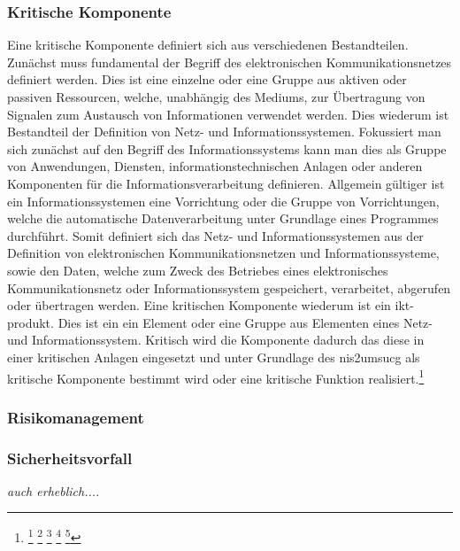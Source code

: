 \documentclass[11pt,a4paper,hidelinks]{article}   %
\begin{document}
            \subsubsection{Kritische Komponente}
            Eine kritische Komponente definiert sich aus verschiedenen Bestandteilen. Zunächst muss fundamental der Begriff des elektronischen Kommunikationsnetzes definiert werden. Dies ist eine einzelne oder eine Gruppe aus aktiven oder passiven Ressourcen, welche, unabhängig des Mediums, zur Übertragung von Signalen zum Austausch von Informationen verwendet werden. Dies wiederum ist Bestandteil der Definition von Netz- und Informationssystemen. Fokussiert man sich zunächst auf den Begriff des Informationssystems kann man dies als Gruppe von Anwendungen, Diensten, informationstechnischen Anlagen oder anderen Komponenten für die Informationsverarbeitung definieren. Allgemein gültiger ist ein Informationssystemen eine Vorrichtung oder die Gruppe von Vorrichtungen, welche die automatische Datenverarbeitung unter Grundlage eines Programmes durchführt. Somit definiert sich das Netz- und Informationssystemen aus der Definition von elektronischen Kommunikationsnetzen und Informationssysteme, sowie den Daten, welche zum Zweck des Betriebes eines elektronisches Kommunikationsnetz oder Informationssystem gespeichert, verarbeitet, abgerufen oder übertragen werden. Eine kritischen Komponente wiederum ist ein \gls{ikt-produkt}. Dies ist ein ein Element oder eine Gruppe aus Elementen eines Netz- und Informationssystem. Kritisch wird die Komponente dadurch das diese in einer kritischen Anlagen eingesetzt und unter Grundlage des \gls{nis2umsucg} als kritische Komponente bestimmt wird oder eine kritische Funktion realisiert.\footnote{
                \footcite[Vgl. §2 Nummer 23][]{NIS2UmsuCG}
                \footcite[Vgl. Artikel 4, Nummer 1][]{EU2016-1148}
                \footcite[Vgl. Artikel 2, Buchstabe a][]{EU2002-21-EG}
                \footcite[Vgl. Artikel 2, Nummer 12][]{EU2019-881}
                \footcite[Vgl. S. 5][]{iso27000-2018}
            }

            \subsubsection{Risikomanagement}

            \subsubsection{Sicherheitsvorfall}
            \emph{auch erheblich....}
        
\end{document}
